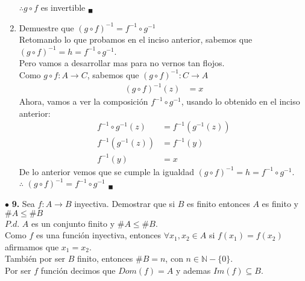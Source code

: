 \documentclass[12pt]{article}
\begin{document}
\begin{enumerate}[label=\alph*)]
    $\therefore g \circ f$ es invertible $_\blacksquare$

    \item Demuestre que ${\displaystyle (g \circ f)^{-1}} = {\displaystyle f^{-1} \circ g^{-1}}$\\

    Retomando lo que probamos en el inciso anterior, sabemos que $(g \circ f)^{-1} = h = f^{-1} \circ g^{-1}$.\\

    Pero vamos a desarrollar mas para no vernos tan flojos.\\

    Como $g \circ f: A \longrightarrow C$, sabemos que $(g \circ f)^{-1}: C \longrightarrow A$
    \begin{align*}
        (g \circ f)^{-1}(z) &= x
    \end{align*}
    Ahora, vamos a ver la composición $f^{-1} \circ g^{-1}$, usando lo obtenido en el inciso anterior:
    \begin{align*}
        f^{-1} \circ g^{-1}(z) &= f^{-1}(g^{-1}(z))\\
        f^{-1}(g^{-1}(z)) &= f^{-1}(y)\\
        f^{-1}(y) &= x 
    \end{align*}
    De lo anterior vemos que se cumple la igualdad $(g \circ f)^{-1} = h = f^{-1} \circ g^{-1}$.\\

    $\therefore$ $(g \circ f)^{-1} = f^{-1} \circ g^{-1}$ $_\blacksquare$
    
\end{enumerate}

\vspace{0.5cm}
% 
%
$\bullet$ \textbf{9.} Sea ${\displaystyle f: A \longrightarrow B}$ inyectiva. Demostrar que si $B$ es finito entonces $A$ es finito y $\# A \leq \#B$\\

$P.d$. $A$ es un conjunto finito y $\# A \leq \#B$.\\

Como $f$ es una función inyectiva, entonces $\forall x_1, x_2 \in A$ si $f(x_1) = f(x_2)$ afirmamos que $x_1 = x_2$.\\

También por ser $B$ finito, entonces $\# B = n$, con $n \in \mathbb{N} - \{0\}$.\\

Por ser $f$ función decimos que $Dom(f) = A$ y ademas $Im(f) \subseteq B$.\\
\end{document}
